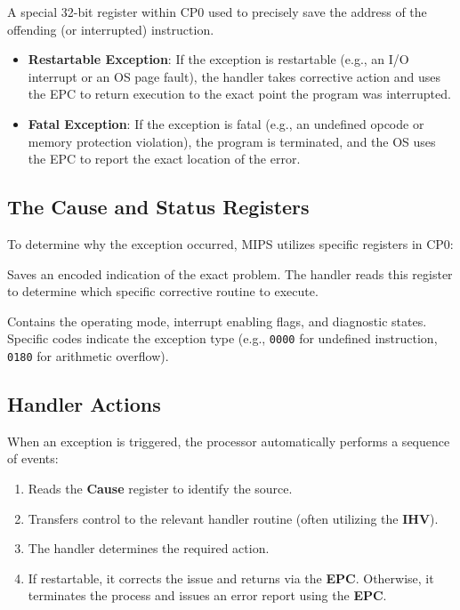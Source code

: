 \begin{definition}
A special 32-bit register within CP0 used to precisely save the address of the offending (or interrupted) instruction.
\end{definition}

\begin{itemize}
    \item \textbf{Restartable Exception}: If the exception is restartable (e.g., an I/O interrupt or an OS page fault), the handler takes corrective action and uses the EPC to return execution to the exact point the program was interrupted.
    \item \textbf{Fatal Exception}: If the exception is fatal (e.g., an undefined opcode or memory protection violation), the program is terminated, and the OS uses the EPC to report the exact location of the error.
\end{itemize}

\subsection{The Cause and Status Registers}
To determine why the exception occurred, MIPS utilizes specific registers in CP0:

\begin{definition}
Saves an encoded indication of the exact problem. The handler reads this register to determine which specific corrective routine to execute.
\end{definition}

\begin{definition}
Contains the operating mode, interrupt enabling flags, and diagnostic states. Specific codes indicate the exception type (e.g., \texttt{0000} for undefined instruction, \texttt{0180} for arithmetic overflow).
\end{definition}

\needspace{4cm}
\subsection{Handler Actions}
When an exception is triggered, the processor automatically performs a sequence of events:

\begin{enumerate}
    \item Reads the \textbf{Cause} register to identify the source.
    \item Transfers control to the relevant handler routine (often utilizing the \textbf{IHV}).
    \item The handler determines the required action.
    \item If restartable, it corrects the issue and returns via the \textbf{EPC}. Otherwise, it terminates the process and issues an error report using the \textbf{EPC}.
\end{enumerate}

